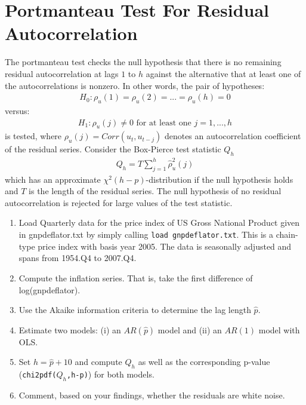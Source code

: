 \documentclass{article}
\begin{document}
\section{Portmanteau Test For Residual Autocorrelation}
The portmanteau test checks the null hypothesis that there is no remaining residual autocorrelation at lags $1$ to $h$ against the alternative that at least one of the autocorrelations is nonzero. In other words, the pair of hypotheses:
\begin{align*}
H_0:\rho_u(1)=\rho_u(2)=...=\rho_u(h) = 0
\end{align*}
versus:
\begin{align*}
H_1:\rho_u(j)\neq 0 \text{ for at least one }j=1,...,h
\end{align*}
is tested, where $\rho_u(j) = Corr(u_t, u_{t-j})$ denotes an autocorrelation coefficient of
the residual series. Consider the Box-Pierce test statistic $Q_h$
\begin{align*}
Q_h = T \sum_{j=1}^h \hat{\rho}^2_u(j)
\end{align*}
which has an approximate $\chi^2(h-p)$-distribution if the null hypothesis holds and $T$ is the length of the residual series. The null hypothesis of no residual autocorrelation is rejected for large values of the test statistic. 

\begin{enumerate}
	\item Load Quarterly data for the price index of US Gross National Product given in gnpdeflator.txt by simply calling \texttt{load gnpdeflator.txt}. This is a chain-type price index with basis year 2005. The data is seasonally adjusted and spans from 1954.Q4 to 2007.Q4.
	\item Compute the inflation series. That is, take the first difference of log(gnpdeflator).
	\item Use the Akaike information criteria to determine the lag length $\hat{p}$.
	\item Estimate two models: (i) an $AR(\hat{p})$ model and (ii) an $AR(1)$ model with OLS.
	\item Set $h=\hat{p}+10$ and compute $Q_h$ as well as the corresponding p-value (\texttt{chi2pdf($Q_h$,h-p)}) for both models.
	\item Comment, based on your findings, whether the residuals are white noise.
\end{enumerate}

%
\newpage
\end{document}
